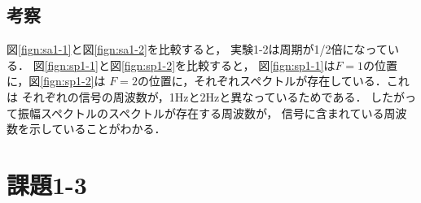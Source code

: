 \documentclass[11pt, a4paper, titlepage]{ltjsarticle}
\begin{document}
\subsection*{考察}
図\ref*{fign:sa1-1}と図\ref*{fign:sa1-2}を比較すると，
実験1-2は周期が1/2倍になっている．
図\ref*{fign:sp1-1}と図\ref*{fign:sp1-2}を比較すると，
図\ref*{fign:sp1-1}は$F=1$の位置に，図\ref*{fign:sp1-2}は
$F=2$の位置に，それぞれスペクトルが存在している．これは
それぞれの信号の周波数が，1Hzと2Hzと異なっているためである．
したがって振幅スペクトルのスペクトルが存在する周波数が，
信号に含まれている周波数を示していることがわかる．



\newpage
\section*{課題1-3}
\end{document}
